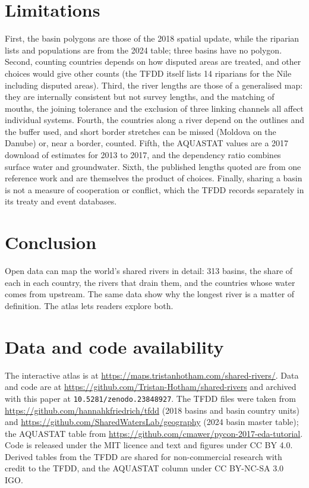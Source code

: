 \documentclass[11pt,a4paper]{article}
\begin{document}
\section{Limitations}
First, the basin polygons are those of the 2018 spatial update, while the riparian lists and populations are from the 2024 table; three basins have no polygon. Second, counting countries depends on how disputed areas are treated, and other choices would give other counts (the TFDD itself lists 14 riparians for the Nile including disputed areas). Third, the river lengths are those of a generalised map: they are internally consistent but not survey lengths, and the matching of mouths, the joining tolerance and the exclusion of three linking channels all affect individual systems. Fourth, the countries along a river depend on the outlines and the buffer used, and short border stretches can be missed (Moldova on the Danube) or, near a border, counted. Fifth, the AQUASTAT values are a 2017 download of estimates for 2013 to 2017, and the dependency ratio combines surface water and groundwater. Sixth, the published lengths quoted are from one reference work and are themselves the product of choices. Finally, sharing a basin is not a measure of cooperation or conflict, which the TFDD records separately in its treaty and event databases.

\section{Conclusion}
Open data can map the world's shared rivers in detail: 313 basins, the share of each in each country, the rivers that drain them, and the countries whose water comes from upstream. The same data show why the longest river is a matter of definition. The atlas lets readers explore both.

\section*{Data and code availability}
The interactive atlas is at \url{https://maps.tristanhotham.com/shared-rivers/}. Data and code are at \url{https://github.com/Tristan-Hotham/shared-rivers} and archived with this paper at \texttt{10.5281/zenodo.23848927}. The TFDD files were taken from \url{https://github.com/hannahkfriedrich/tfdd} (2018 basins and basin country units) and \url{https://github.com/SharedWatersLab/geography} (2024 basin master table); the AQUASTAT table from \url{https://github.com/cmawer/pycon-2017-eda-tutorial}. Code is released under the MIT licence and text and figures under CC BY 4.0. Derived tables from the TFDD are shared for non-commercial research with credit to the TFDD, and the AQUASTAT column under CC BY-NC-SA 3.0 IGO.
\end{document}
